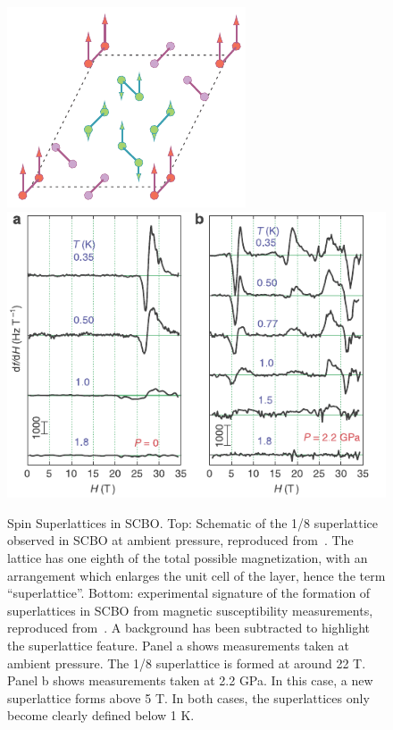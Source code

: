 \documentclass{thesis-umich}
\begin{document}
\begin{figure}
	\centering
	\caption[Spin Superlattices in SCBO]{Spin Superlattices in SCBO. Top: Schematic of the 1/8 superlattice observed in SCBO at ambient pressure, reproduced from~\cite{Rice2002}. The lattice has one eighth of the total possible magnetization, with an arrangement which enlarges the unit cell of the layer, hence the term ``superlattice''. Bottom: experimental signature of the formation of superlattices in SCBO from magnetic susceptibility measurements, reproduced from~\cite{Haravifard2016}. A background has been subtracted to highlight the superlattice feature. Panel a shows measurements taken at ambient pressure. The 1/8 superlattice is formed at around 22 T. Panel b shows measurements taken at 2.2 GPa. In this case, a new superlattice forms above 5 T. In both cases, the superlattices only become clearly defined below 1 K.}
	\label{fig:SCBO_superlattice}
	\includegraphics[width=0.6\columnwidth]{figures/SCBO_superlattice.pdf}
	\includegraphics[width=0.9\columnwidth]{figures/SCBO_plateaus.pdf}
\end{figure}
\end{document}
